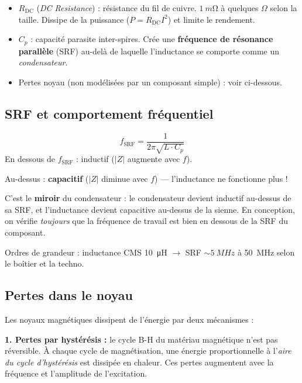 \documentclass[12pt,a4paper,twoside]{book}
\begin{document}
\begin{itemize}[nosep]
\item $R_{\text{DC}}$ (\textit{DC Resistance}) : résistance du fil de cuivre. $\SI{1}{m\ohm}$ à quelques $\Omega$ selon la taille. Dissipe de la puissance ($P = R_{\text{DC}} I^2$) et limite le rendement.
\item $C_p$ : capacité parasite inter-spires. Crée une \textbf{fréquence de résonance parallèle} (SRF) au-delà de laquelle l'inductance se comporte comme un \textit{condensateur}.
\item Pertes noyau (non modélisées par un composant simple) : voir ci-dessous.
\end{itemize}

\subsection{SRF et comportement fréquentiel}

\begin{formule}
\[
\boxed{f_{\text{SRF}} = \frac{1}{2\pi\sqrt{L \cdot C_p}}}
\]
En dessous de $f_{\text{SRF}}$ : inductif ($|Z|$ augmente avec $f$).

Au-dessus : \textbf{capacitif} ($|Z|$ diminue avec $f$) --- l'inductance ne fonctionne plus !
\end{formule}

\begin{pratique}
C'est le \textbf{miroir} du condensateur : le condensateur devient inductif au-dessus de sa SRF, et l'inductance devient capacitive au-dessus de la sienne. En conception, on vérifie \textit{toujours} que la fréquence de travail est bien en dessous de la SRF du composant.

Ordres de grandeur : inductance CMS \SI{10}{\micro H} $\rightarrow$ SRF $\sim \SI{5}{MHz}$ à \SI{50}{MHz} selon le boîtier et la techno.
\end{pratique}

\subsection{Pertes dans le noyau}

Les noyaux magnétiques dissipent de l'énergie par deux mécanismes :

\textbf{1. Pertes par hystérésis :} le cycle B-H du matériau magnétique n'est pas réversible. À chaque cycle de magnétisation, une énergie proportionnelle à l'\textit{aire du cycle d'hystérésis} est dissipée en chaleur. Ces pertes augmentent avec la fréquence et l'amplitude de l'excitation.
\end{document}
